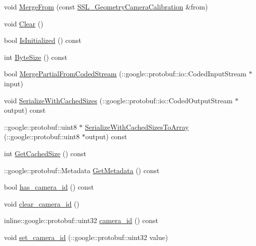 \begin{DoxyCompactItemize}
\item 
void \hyperlink{class_s_s_l___geometry_camera_calibration_a6e8a27be95725a0a1a418e759e5e4d50}{Merge\-From} (const \hyperlink{class_s_s_l___geometry_camera_calibration}{S\-S\-L\-\_\-\-Geometry\-Camera\-Calibration} \&from)
\item 
void \hyperlink{class_s_s_l___geometry_camera_calibration_a455127dd2a8bd774944d63249aa1c19a}{Clear} ()
\item 
bool \hyperlink{class_s_s_l___geometry_camera_calibration_ac45359c42e7d0d822871b925f53d9ecd}{Is\-Initialized} () const 
\item 
int \hyperlink{class_s_s_l___geometry_camera_calibration_abb7139e2451b58306f0834a75cacc288}{Byte\-Size} () const 
\item 
bool \hyperlink{class_s_s_l___geometry_camera_calibration_a50e03f99cadddab0719d943c880f578d}{Merge\-Partial\-From\-Coded\-Stream} (\-::google\-::protobuf\-::io\-::\-Coded\-Input\-Stream $\ast$input)
\item 
void \hyperlink{class_s_s_l___geometry_camera_calibration_ae5236c4bc183fb4b2e1ea5060776d574}{Serialize\-With\-Cached\-Sizes} (\-::google\-::protobuf\-::io\-::\-Coded\-Output\-Stream $\ast$output) const 
\item 
\-::google\-::protobuf\-::uint8 $\ast$ \hyperlink{class_s_s_l___geometry_camera_calibration_a32e3e4343e21d661d15bea45dd5a322d}{Serialize\-With\-Cached\-Sizes\-To\-Array} (\-::google\-::protobuf\-::uint8 $\ast$output) const 
\item 
int \hyperlink{class_s_s_l___geometry_camera_calibration_ac1d80c624c950a2dff982d2a03390aa9}{Get\-Cached\-Size} () const 
\item 
\-::google\-::protobuf\-::\-Metadata \hyperlink{class_s_s_l___geometry_camera_calibration_aedff2c505b85a0f6eb91e6b2ea35b8c8}{Get\-Metadata} () const 
\item 
bool \hyperlink{class_s_s_l___geometry_camera_calibration_a790ef90780a15f12742dfb8139287802}{has\-\_\-camera\-\_\-id} () const 
\item 
void \hyperlink{class_s_s_l___geometry_camera_calibration_a4e114583b194bfb0f6213c2b75979d6b}{clear\-\_\-camera\-\_\-id} ()
\item 
inline\-::google\-::protobuf\-::uint32 \hyperlink{class_s_s_l___geometry_camera_calibration_a373965d7280a2a26dc6fd7aecbc35e8f}{camera\-\_\-id} () const 
\item 
void \hyperlink{class_s_s_l___geometry_camera_calibration_a653cbce9fd08291e74b1c8f353ca23f8}{set\-\_\-camera\-\_\-id} (\-::google\-::protobuf\-::uint32 value)

\end{DoxyCompactItemize}
